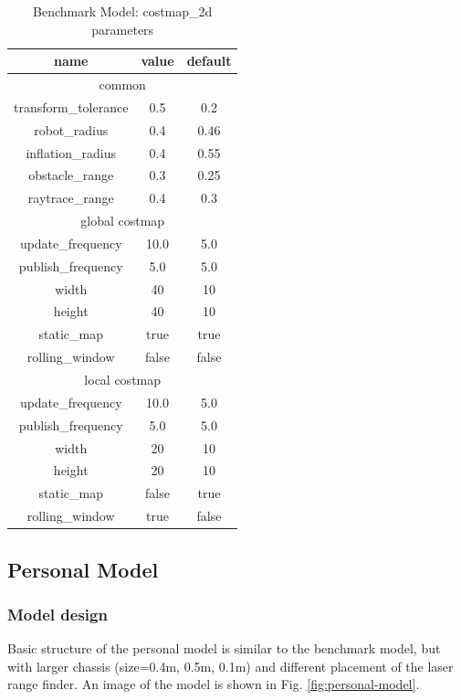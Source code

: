 \documentclass[10pt,journal,compsoc]{IEEEtran}
\begin{document}
\begin{table}[h]
\caption{Benchmark Model: costmap\_2d parameters}
\label{tab:bench-costmap-2d}
\begin{center}
\begin{tabular}{|c|c|c|}
\hline
name & value & default \\
\hline
\hline
\multicolumn{3}{|c|}{common} \\
\hline
transform\_tolerance & 0.5 & 0.2 \\
\hline
robot\_radius & 0.4 & 0.46\\
\hline
inflation\_radius & 0.4 & 0.55\\
\hline
obstacle\_range & 0.3 & 0.25\\
\hline
raytrace\_range & 0.4 & 0.3\\
\hline
\multicolumn{3}{|c|}{global costmap} \\
\hline
update\_frequency & 10.0 & 5.0 \\
\hline
publish\_frequency & 5.0 & 5.0 \\
\hline
width & 40 & 10 \\
\hline
height & 40 & 10 \\
\hline
static\_map & true & true \\
\hline
rolling\_window & false & false \\
\hline
\multicolumn{3}{|c|}{local costmap} \\
\hline
update\_frequency & 10.0 & 5.0 \\
\hline
publish\_frequency & 5.0 & 5.0 \\
\hline
width & 20 & 10 \\
\hline
height & 20 & 10 \\
\hline
static\_map & false & true \\
\hline
rolling\_window & true & false \\
\hline
\end{tabular}
\end{center}
\end{table}

\subsection{Personal Model}
\subsubsection{Model design}
Basic structure of the personal model is similar to the benchmark model, but with larger chassis (size=0.4m, 0.5m, 0.1m) and different placement of the laser range finder. An image of the model is shown in Fig. \ref{fig:personal-model}.
\end{document}
